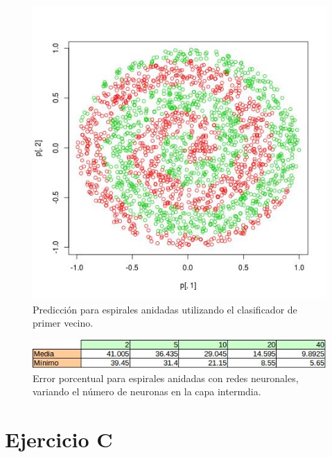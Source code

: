 \documentclass[12pt, a4paper]{article}
\begin{document}
 \begin{figure}
    \centering
	\includegraphics[scale=0.4]{espirales12}
	\caption{Predicción para espirales anidadas utilizando el clasificador de primer vecino.}
\end{figure}

 \begin{figure}
    \centering
	\includegraphics[scale=1]{tablaB}
	\caption{Error porcentual para espirales anidadas con redes neuronales, variando el número de neuronas en la capa intermdia.}
\end{figure}


\section*{Ejercicio C}
\end{document}
